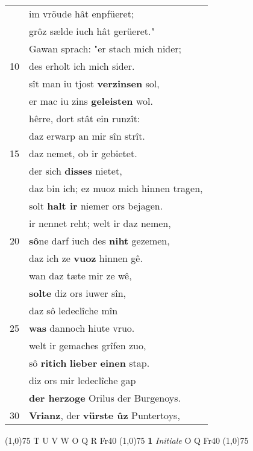 \documentclass[8pt,a4paper,notitlepage]{article}
\begin{document}
\begin{table}[ht]
\begin{minipage}[t]{0.5\linewidth}
\begin{tabular}{rl}
 & im vröude hât enpfüeret;\\ 
 & grôz sælde iuch hât gerüeret."\\ 
 & Gawan sprach: "er stach mich nider;\\ 
10 & des erholt ich mich sider.\\ 
 & sît man iu tjost \textbf{verzinsen} sol,\\ 
 & er mac iu zins \textbf{geleisten} wol.\\ 
 & hêrre, dort stât ein runzît:\\ 
 & daz erwarp an mir sîn strît.\\ 
15 & daz nemet, ob ir gebietet.\\ 
 & der sich \textbf{disses} nietet,\\ 
 & daz bin ich; ez muoz mich hinnen tragen,\\ 
 & solt \textbf{halt ir} niemer ors bejagen.\\ 
 & ir nennet reht; welt ir daz nemen,\\ 
20 & \textbf{sô}ne darf iuch des \textbf{niht} gezemen,\\ 
 & daz ich ze \textbf{vuoz} hinnen gê.\\ 
 & wan daz tæte mir ze wê,\\ 
 & \textbf{solte} diz ors iuwer sîn,\\ 
 & daz sô ledeclîche mîn\\ 
25 & \textbf{was} dannoch hiute vruo.\\ 
 & welt ir gemaches grîfen zuo,\\ 
 & sô \textbf{ritich} \textbf{lieber} \textbf{einen} stap.\\ 
 & diz ors mir ledeclîche gap\\ 
 & \textbf{der herzoge} Orilus der Burgenoys.\\ 
30 & \textbf{Vrianz}, der \textbf{vürste ûz} Puntertoys,\\ 
\end{tabular}
\scriptsize
\line(1,0){75} \newline
T U V W O Q R Fr40 \newline
\line(1,0){75} \newline
\textbf{1} \textit{Initiale} O Q Fr40  \newline
\line(1,0){75} \newline

\end{minipage}
\end{table}
\end{document}
